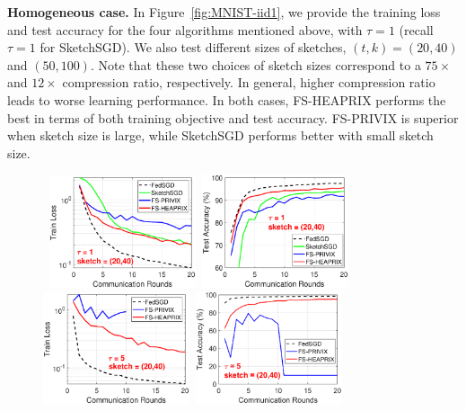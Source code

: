 \documentclass[twoside]{article}
\begin{document}
\textbf{Homogeneous case.} In Figure~\ref{fig:MNIST-iid1}, we provide the training loss and test accuracy for the four algorithms mentioned above, with $\tau=1$ (recall $\tau = 1$ for SketchSGD). 
We also test different sizes of sketches, $(t,k)=(20,40)$ and $(50,100)$. 
Note that these two choices of sketch sizes correspond to a $75\times$ and $12\times$ compression ratio, respectively. 
In general, higher compression ratio leads to worse learning performance. 
In both cases, FS-HEAPRIX performs the best in terms of both training objective and test accuracy. 
FS-PRIVIX is superior when sketch size is large, while SketchSGD performs better with small sketch size. 
\begin{figure}[t]
	\begin{center}
		\mbox{			  
		 \includegraphics[width=1.7in]{MNIST_figures/local1_sketch20_iid1_train_loss.eps} \hspace{-0.2in}
		 \includegraphics[width=1.7in]{MNIST_figures/local1_sketch20_iid1_test_acc.eps} \hspace{-0.2in}
		 }
		\mbox{
		\includegraphics[width=1.7in]{MNIST_figures/local5_sketch20_iid1_train_loss.eps}\hspace{-0.2in}
		\includegraphics[width=1.7in]{MNIST_figures/local5_sketch20_iid1_test_acc.eps}\hspace{-0.2in}
}
\end{center}
\end{figure}
\end{document}
